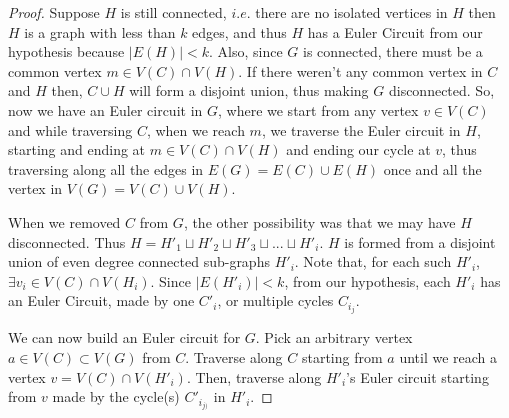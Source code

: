 \documentclass[12pt, fullpage]{article}
\begin{document}
\begin{enumerate}
\begin{proof}
 	  Suppose $H$ is still connected, $i.e.$ there are no isolated vertices in $H$ then $H$ is a graph with less than $k$ edges, and thus $H$ has a Euler Circuit from our hypothesis because $\vert E(H) \vert < k$. Also, since $G$ is connected, there must be a common vertex $m \in V(C) \cap V(H)$. If there weren't any common vertex in $C$ and $H$ then, $C \cup H$ will form a disjoint union, thus making $G$ disconnected. So, now we have an Euler circuit in $G$, where we start from any vertex $v \in V(C)$ and while traversing $C$, when we reach $m$, we traverse the Euler circuit in $H$, starting and ending at $m \in V(C) \cap V(H)$ and ending our cycle at $v$, thus traversing along all the edges in $E(G) = E(C) \cup E(H)$ once and all the vertex in $V(G) = V(C) \cup V(H)$.
 	 
 	   When we removed $C$ from $G$, the other possibility was that we may have $H$ disconnected. Thus $H = H'_1 \sqcup H'_2 \sqcup H'_3 \sqcup ... \sqcup H'_i$. $H$ is formed from a disjoint union of even degree connected sub-graphs $H'_i$. Note that, for each such $H'_i$, $\exists v_i \in V(C) \cap V(H_i)$. Since $\vert E(H'_i) \vert < k$, from our hypothesis, each $H'_i$ has an Euler Circuit, made by one $C'_i$, or multiple cycles $C_{i_j}$.
 	   
 	   We can now build an Euler circuit for $G$. Pick an arbitrary vertex $a \in V(C) \subset V(G)$ from $C$. Traverse along $C$ starting from $a$ until we reach a vertex $v = V(C) \cap V(H'_i)$. Then, traverse along $H'_i$'s Euler circuit starting from $v$ made by the cycle(s) $C'_{i_{j)}}$ in $H'_i$. 
 	   

\end{proof}
\end{enumerate}
\end{document}
